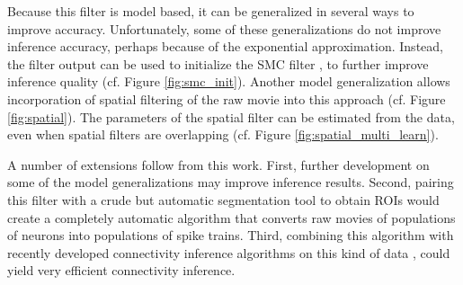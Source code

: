 Because this filter is model based, it can be generalized in several ways to improve accuracy.  Unfortunately, some of these generalizations do not improve inference accuracy, perhaps because of the exponential approximation.  Instead, the \foopsi filter output can be used to initialize the SMC filter \cite{VogelsteinPaninski09}, to further improve inference quality (cf. Figure \ref{fig:smc_init}).  Another model generalization allows incorporation of spatial filtering of the raw movie into this approach (cf. Figure \ref{fig:spatial}).  The parameters of the spatial filter can be estimated from the data, even when spatial filters are overlapping (cf. Figure \ref{fig:spatial_multi_learn}).

A number of extensions follow from this work.  First, further development on some of the model generalizations may improve inference results. Second, pairing this filter with a crude but automatic segmentation tool to obtain ROIs would create a completely automatic algorithm that converts raw movies of populations of neurons into populations of spike trains.  Third, combining this algorithm with recently developed connectivity inference algorithms on this kind of data \cite{MishchenkoPaninski09}, could yield very efficient connectivity inference.